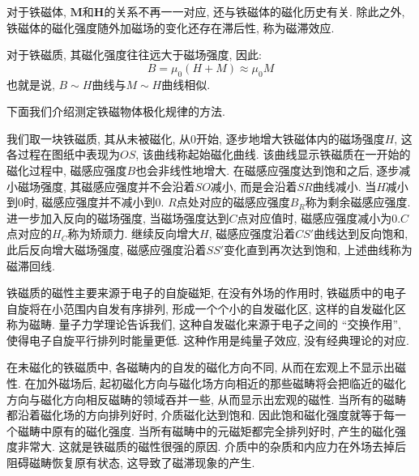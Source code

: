 对于铁磁体, $\mathbf{M}$和$\mathbf{H}$的关系不再一一对应, 还与铁磁体的磁化历史有关. 除此之外, 铁磁体的磁化强度随外加磁场的变化还存在滞后性, 称为磁滞效应.

对于铁磁质, 其磁化强度往往远大于磁场强度, 因此:
\[
B = \mu_0(H+M) \approx \mu_0 M
\]
也就是说, $B\sim H$曲线与$M\sim H$曲线相似.

下面我们介绍测定铁磁物体极化规律的方法.

我们取一块铁磁质, 其从未被磁化, 从$0$开始, 逐步地增大铁磁体内的磁场强度$H$, 这各过程在图纸中表现为$OS$, 该曲线称起始磁化曲线. 该曲线显示铁磁质在一开始的磁化过程中, 磁感应强度$B$也会非线性地增大. 在磁感应强度达到饱和之后, 逐步减小磁场强度, 其磁感应强度并不会沿着$SO$减小, 而是会沿着$SR$曲线减小. 当$H$减小到$0$时, 磁感应强度并不减小到$0$. $R$点处对应的磁感应强度$B_R$称为剩余磁感应强度. 进一步加入反向的磁场强度, 当磁场强度达到$C$点对应值时, 磁感应强度减小为$0$.$C$点对应的$H_C$称为矫顽力. 继续反向增大$H$, 磁感应强度沿着$CS'$曲线达到反向饱和, 此后反向增大磁场强度, 磁感应强度沿着$SS'$变化直到再次达到饱和, 上述曲线称为磁滞回线.

铁磁质的磁性主要来源于电子的自旋磁矩, 在没有外场的作用时, 铁磁质中的电子自旋将在小范围内自发有序排列, 形成一个个小的自发磁化区, 这样的自发磁化区称为磁畴. 量子力学理论告诉我们, 这种自发磁化来源于电子之间的 ``交换作用'', 使得电子自旋平行排列时能量更低. 这种作用是纯量子效应, 没有经典理论的对应.

在未磁化的铁磁质中, 各磁畴内的自发的磁化方向不同, 从而在宏观上不显示出磁性. 在加外磁场后, 起初磁化方向与磁化场方向相近的那些磁畴将会把临近的磁化方向与磁化方向相反磁畴的领域吞并一些, 从而显示出宏观的磁性. 当所有的磁畴都沿着磁化场的方向排列好时, 介质磁化达到饱和. 因此饱和磁化强度就等于每一个磁畴中原有的磁化强度. 当所有磁畴中的元磁矩都完全排列好时, 产生的磁化强度非常大. 这就是铁磁质的磁性很强的原因. 介质中的杂质和内应力在外场去掉后阻碍磁畴恢复原有状态, 这导致了磁滞现象的产生.

